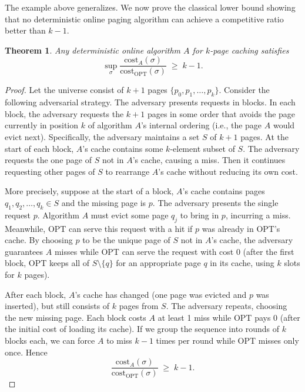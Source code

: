\documentclass[twoside,12pt]{book}
\theoremstyle{plain}
\newtheorem{theorem}{Theorem}[chapter]
\theoremstyle{definition}
\theoremstyle{remark}
\begin{document}
The example above generalizes.  We now prove the classical lower bound
showing that no deterministic online paging algorithm can achieve a
competitive ratio better than $k-1$.

\begin{theorem}\label{thm:paging-det-lb}
Any deterministic online algorithm $A$ for $k$-page caching satisfies
\[
  \sup_\sigma \frac{\mathrm{cost}_A(\sigma)}{\mathrm{cost}_{\mathrm{OPT}}(\sigma)} \;\ge\; k - 1.
\]
\end{theorem}

\begin{proof}
Let the universe consist of $k+1$ pages $\{p_0, p_1, \ldots, p_k\}$.
Consider the following adversarial strategy.  The adversary presents
requests in blocks.  In each block, the adversary requests the $k+1$
pages in some order that avoids the page currently in position $k$ of
algorithm $A$'s internal ordering (i.e., the page $A$ would evict
next).  Specifically, the adversary maintains a set $S$ of $k+1$ pages.
At the start of each block, $A$'s cache contains some $k$-element subset
of $S$.  The adversary requests the one page of $S$ not in $A$'s cache,
causing a miss.  Then it continues requesting other pages of $S$ to
rearrange $A$'s cache without reducing its own cost.

More precisely, suppose at the start of a block, $A$'s cache contains
pages $q_1, q_2, \ldots, q_k \in S$ and the missing page is $p$.  The
adversary presents the single request $p$.  Algorithm $A$ must evict
some page $q_j$ to bring in $p$, incurring a miss.  Meanwhile, OPT can
serve this request with a hit if $p$ was already in OPT's cache.  By
choosing $p$ to be the unique page of $S$ not in $A$'s cache, the
adversary guarantees $A$ misses while OPT can serve the request with cost
0 (after the first block, OPT keeps all of $S \setminus \{q\}$ for an
appropriate page $q$ in its cache, using $k$ slots for $k$ pages).

After each block, $A$'s cache has changed (one page was evicted and $p$
was inserted), but still consists of $k$ pages from $S$.  The adversary
repeats, choosing the new missing page.  Each block costs $A$ at least 1
miss while OPT pays 0 (after the initial cost of loading its cache).  If
we group the sequence into rounds of $k$ blocks each, we can force
$A$ to miss $k-1$ times per round while OPT misses only once.  Hence
\[
  \frac{\mathrm{cost}_A(\sigma)}{\mathrm{cost}_{\mathrm{OPT}}(\sigma)} \;\ge\; k-1.
\]
\end{proof}
\end{document}
